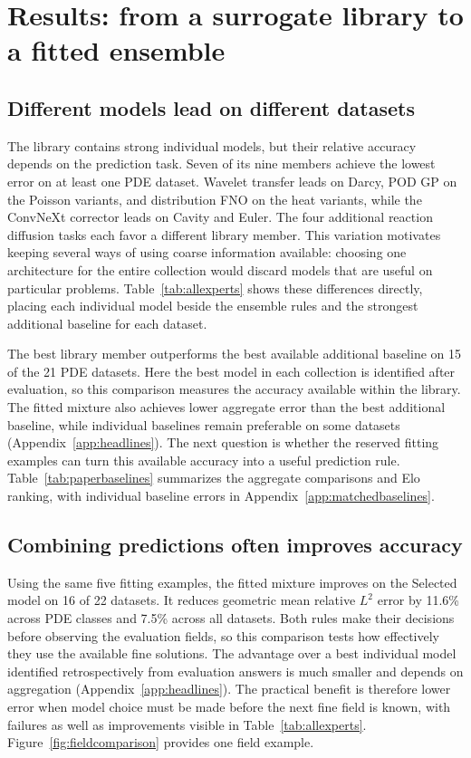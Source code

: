 \section{Results: from a surrogate library to a fitted ensemble}
\label{sec:results}
\subsection{Different models lead on different datasets}
The library contains strong individual models, but their relative accuracy
depends on the prediction task. Seven of its nine members achieve the lowest
error on at least one PDE dataset. Wavelet transfer leads on Darcy, POD GP on
the Poisson variants, and distribution FNO on the heat variants, while the
ConvNeXt corrector leads on Cavity and Euler. The four additional reaction
diffusion tasks each favor a different library member. This variation motivates keeping
several ways of using coarse information available: choosing one architecture
for the entire collection would discard models that are useful on particular
problems. Table~\ref{tab:allexperts} shows these differences directly, placing
each individual model beside the ensemble rules and the strongest additional
baseline for each dataset.

The best library member outperforms the best available additional baseline on
15 of the 21 PDE datasets. Here the best model in each collection is identified
after evaluation, so this comparison measures the accuracy available within
the library. The fitted mixture also achieves lower aggregate error than the
best additional baseline, while individual baselines remain preferable on
some datasets (Appendix~\ref{app:headlines}). The next question is whether the
reserved fitting examples can turn this available accuracy into a useful
prediction rule. Table~\ref{tab:paperbaselines} summarizes the aggregate
comparisons and Elo ranking, with individual baseline errors in
Appendix~\ref{app:matchedbaselines}.



\subsection{Combining predictions often improves accuracy}
Using the same five fitting examples, the fitted mixture improves on the
Selected model on 16 of 22 datasets. It reduces geometric mean relative
$L^2$ error by 11.6\% across PDE classes and 7.5\% across all datasets.
Both rules make their decisions before observing the evaluation fields, so
this comparison tests how effectively they use the available fine solutions.
The advantage over a best individual model identified retrospectively from
evaluation answers is much smaller and depends on aggregation
(Appendix~\ref{app:headlines}). The practical benefit is therefore lower error
when model choice must be made before the next fine field is known, with
failures as well as improvements visible in Table~\ref{tab:allexperts}.
Figure~\ref{fig:fieldcomparison} provides one field example.

